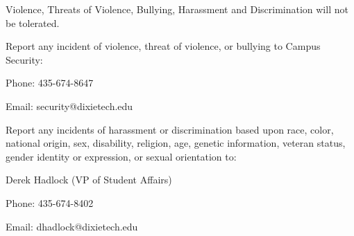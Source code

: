 Violence, Threats of Violence, Bullying, Harassment and Discrimination will not be tolerated.
\par
\bigskip
Report any incident of violence, threat of violence, or bullying to Campus Security:
\par
Phone: 435-674-8647
\par
Email: security@dixietech.edu
\par
\bigskip
Report any incidents of harassment or discrimination based upon race, color, national origin, sex, disability, religion, age, genetic information, veteran status, gender identity or expression, or sexual orientation to:
\par
Derek Hadlock (VP of Student Affairs)
\par
Phone: 435-674-8402
\par
Email: dhadlock@dixietech.edu 
